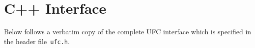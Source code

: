 \chapter{C++ Interface}

Below follows a verbatim copy of the complete UFC interface which is
specified in the header file~\texttt{ufc.h}.

\scriptsize
{}
\normalsize
